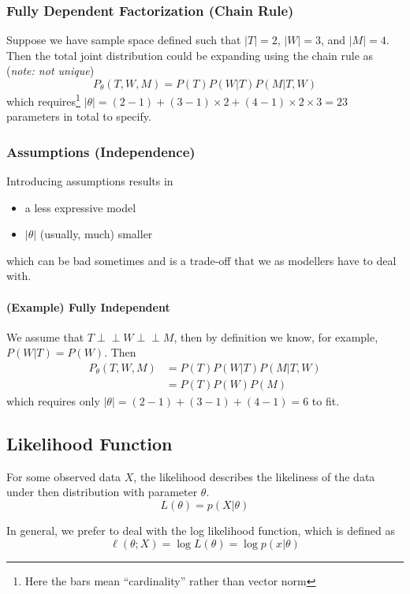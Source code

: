 \documentclass[11pt]{article}
\newcommand{\independent}{\perp \!\!\! \perp}
\begin{document}
\subsubsection{Fully Dependent Factorization (Chain Rule)}
Suppose we have sample space defined such that $|T| = 2$, $|W| = 3$, and $|M| = 4$. Then the total joint distribution could be expanding using the chain rule as (\textit{note: not unique})
\begin{equation*}
    P_\theta(T,W,M) = P(T)P(W|T)P(M|T,W)
\end{equation*} 
which requires\footnote{Here the bars mean ``cardinality'' rather than vector norm} $|\theta| = (2 - 1) + (3 - 1) \times 2 + (4 - 1)\times 2 \times 3 = 23$ parameters in total to specify. 

\subsubsection{Assumptions (Independence)}
Introducing assumptions results in
\begin{itemize}
    \item a less expressive model
    \item $|\theta|$ (usually, much) smaller
\end{itemize}
which can be bad sometimes and is a trade-off that we as modellers have to deal with. 

\paragraph{(Example) Fully Independent}
We assume that $T\independent W \independent M$, then by definition we know, for example, $P(W|T)= P(W)$. Then
\begin{align*}
    P_\theta(T,W,M) &= P(T)P(W|T)P(M|T,W) \\
    &= P(T)P(W)P(M)
\end{align*}
which requires only $|\theta| = (2-1) + (3-1) + (4-1) = 6$ to fit.

\subsection{Likelihood Function}
For some observed data $X$, the likelihood describes the likeliness of the data under then distribution with parameter $\theta$. 
\begin{equation*}
    L(\theta) = p(X|\theta)
\end{equation*}

In general, we prefer to deal with the log likelihood function, which is defined as
\begin{equation*}
    \ell(\theta;X) = \log L(\theta) = \log p(x|\theta)
\end{equation*}
\end{document}
